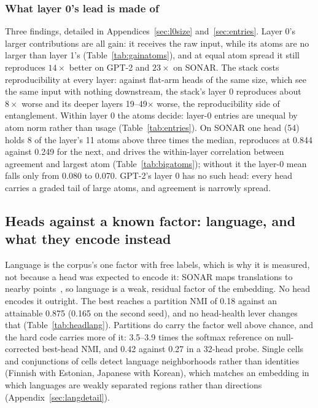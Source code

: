 \subsubsection{What layer 0's lead is made of}

Three findings, detailed in Appendices~\ref{sec:l0size}
and~\ref{sec:entries}. Layer 0's larger contributions are all gain: it
receives the raw input, while its atoms are no larger than layer 1's
(Table~\ref{tab:gainatoms}), and at equal atom spread it still reproduces
$14\times$ better on GPT-2 and $23\times$ on SONAR. The stack costs
reproducibility at every layer: against flat-arm heads of the same size,
which see the same input with nothing downstream, the stack's layer 0
reproduces about $8\times$ worse and its deeper layers 19--49$\times$
worse, the reproducibility side of entanglement. Within layer 0 the atoms
decide: layer-0 entries are unequal by atom norm rather than usage
(Table~\ref{tab:entries}). On SONAR one head (54) holds 8 of the layer's
11 atoms above three times the median, reproduces at 0.844 against 0.249
for the next, and drives the within-layer correlation between agreement
and largest atom (Table~\ref{tab:bigatoms}); without it the layer-0 mean
falls only from 0.080 to 0.070. GPT-2's layer 0 has no such head: every
head carries a graded tail of large atoms, and agreement is narrowly
spread.

\subsection{Heads against a known factor: language, and what they encode instead}
\label{sec:lang}

Language is the corpus's one factor with free labels, which is why it is
measured, not because a head was expected to encode it: SONAR maps
translations to nearby points~\cite{sonar}, so language is a weak, residual factor of
the embedding. No head encodes it outright. The best reaches a partition
NMI of 0.18 against an attainable 0.875 (0.165 on the second seed), and no
head-health lever changes that (Table~\ref{tab:headlang}). Partitions do
carry the factor well above chance, and the hard code carries more of it:
3.5--3.9 times the softmax reference on null-corrected best-head NMI,
and 0.42 against 0.27 in a 32-head probe. Single cells and conjunctions of cells
detect language neighborhoods rather than identities (Finnish with
Estonian, Japanese with Korean), which matches an embedding in which
languages are weakly separated regions rather than directions
(Appendix~\ref{sec:langdetail}).

